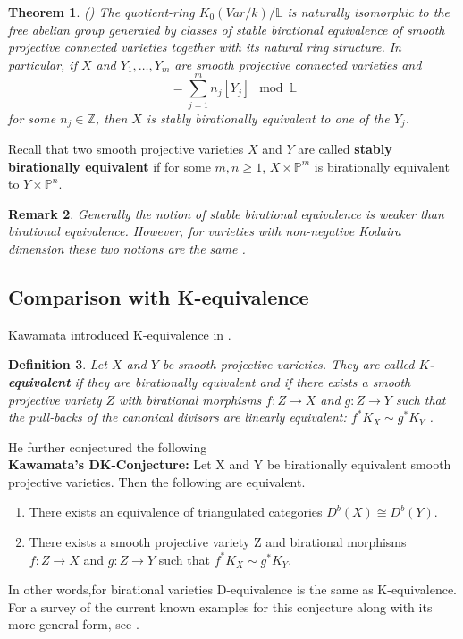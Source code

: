 \documentclass[a4, 11pt]{amsart}
\newtheorem{theorem}{Theorem}[section]
\newtheorem{definition}[theorem]{\sf Definition}
\newtheorem{remark}[theorem]{\sf Remark}
\def \Z{\mathbb Z}
\def \P{\mathbb P}
\def \L{\mathbb L}
\def \ra{\rightarrow}
\def \ra{\rightarrow}
\begin{document}
\begin{theorem}(\cite{LL})
    The quotient-ring $K_0(Var/k)/\L$ is naturally isomorphic to the free abelian group generated by classes of stable birational equivalence of smooth projective connected varieties together with its natural ring structure. In particular, if $X$ and $Y_1, \ldots, Y_m$ are smooth projective connected varieties and 
    \begin{equation*}
        [X] = \sum_{j=1}^{m}n_j[Y_j] \mod \L
    \end{equation*}
for some $n_j \in \Z$, then $X$ is stably birationally equivalent to one of the $Y_j$.
\end{theorem}

Recall that two smooth projective varieties $X$ and $Y$ are called \textbf{stably birationally equivalent} if for some $m, n \geq 1$,  $X \times \P^m$ is birationally equivalent to $Y \times \P^n$.

\begin{remark}
    Generally the notion of stable birational equivalence is weaker than birational equivalence. However, for varieties with non-negative Kodaira dimension these two notions are the same \cite[Lemma 2.6]{SG}.
\end{remark} 

\subsection{Comparison with K-equivalence}

Kawamata introduced K-equivalence in \cite{Kawa1}.

\begin{definition}
    Let $X$ and $Y$ be smooth projective varieties. They are called \textbf{$K$-equivalent} if they are birationally equivalent and if there exists a smooth projective variety $Z$ with birational morphisms $f : Z \ra X$ and $g: Z \ra Y$ such that the pull-backs of the canonical divisors are linearly equivalent: $f^*K_X \sim g^*K_Y$ .
\end{definition}

He further conjectured the following \\

\textbf{Kawamata's DK-Conjecture:} \cite{Kawa1} Let X and Y be birationally equivalent smooth projective
varieties. Then the following are equivalent.
\begin{enumerate}
    \item There exists an equivalence of triangulated categories $D^b(X) \cong D^b(Y)$.
    \item There exists a smooth projective variety Z and birational morphisms $f : Z \ra X$ and $g : Z \ra Y$ such that $f^*K_X \sim g^*K_Y$.
\end{enumerate}
In other words,for birational varieties D-equivalence is the same as K-equivalence. For a survey of the current known examples for this conjecture along with its more general form, see \cite{Kawa2}.
\end{document}
